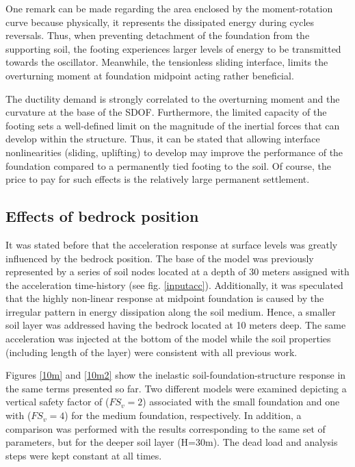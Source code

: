 One remark can be made regarding the area enclosed by the moment-rotation curve because physically, it represents the dissipated energy during cycles reversals. Thus, when preventing detachment of the foundation from the supporting soil, the footing experiences larger levels of energy to be transmitted towards the oscillator. Meanwhile, the tensionless sliding interface, limits the overturning moment at foundation midpoint acting rather beneficial.

The ductility demand is strongly correlated to the overturning moment and the curvature at the base of the SDOF. Furthermore, the limited capacity of the footing sets a well-defined limit on the magnitude of the inertial forces that can develop within the structure. Thus, it can be stated that allowing interface nonlinearities (sliding, uplifting) to develop may improve the performance of the foundation compared to a permanently tied footing to the soil. Of course, the price to pay for such effects is the relatively large permanent settlement. 

\subsection{Effects of bedrock position}
It was stated before that the acceleration response at surface levels was greatly influenced by the bedrock position. The base of the model was previously represented by a series of soil nodes located at a depth of 30 meters assigned with the acceleration time-history (see fig. \ref{inputacc}). Additionally, it was speculated that the highly non-linear response at midpoint foundation is caused by the irregular pattern in energy dissipation along the soil medium. Hence, a smaller soil layer was addressed having the bedrock located at 10 meters deep. The same acceleration was injected at the bottom of the model while the soil properties (including length of the layer) were consistent with all previous work.

Figures \ref{10m} and \ref{10m2} show the inelastic soil-foundation-structure response in the same terms presented so far. Two different models were examined depicting a vertical safety factor of ($FS_v=2$) associated with the small foundation and one with ($FS_v=4$) for the medium foundation, respectively. In addition, a comparison was performed with the results corresponding to the same set of parameters, but for the deeper soil layer (H=30m). The dead load and analysis steps were kept constant at all times.

